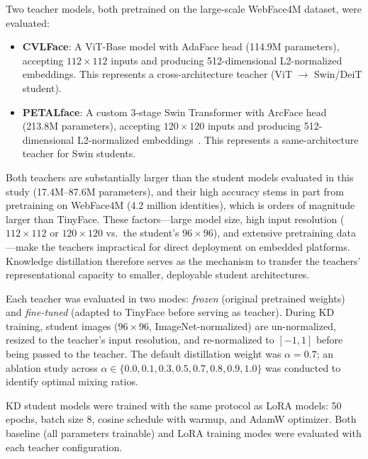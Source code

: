 \documentclass[runningheads,a4paper]{llncs}
\begin{document}
Two teacher models, both pretrained on the large-scale WebFace4M dataset, were evaluated:
\begin{itemize}
    \item \textbf{CVLFace}: A ViT-Base model with AdaFace head (114.9M parameters), accepting $112\times112$ inputs and producing 512-dimensional L2-normalized embeddings. This represents a cross-architecture teacher (ViT $\rightarrow$ Swin/DeiT student).
    \item \textbf{PETALface}: A custom 3-stage Swin Transformer with ArcFace head (213.8M parameters), accepting $120\times120$ inputs and producing 512-dimensional L2-normalized embeddings~\cite{narayan2025petalface}. This represents a same-architecture teacher for Swin students.
\end{itemize}
Both teachers are substantially larger than the student models evaluated in this study (17.4M--87.6M parameters), and their high accuracy stems in part from pretraining on WebFace4M (4.2 million identities), which is orders of magnitude larger than TinyFace. These factors---large model size, high input resolution ($112\times112$ or $120\times120$ vs.\ the student's $96\times96$), and extensive pretraining data---make the teachers impractical for direct deployment on embedded platforms. Knowledge distillation therefore serves as the mechanism to transfer the teachers' representational capacity to smaller, deployable student architectures.

Each teacher was evaluated in two modes: \emph{frozen} (original pretrained weights) and \emph{fine-tuned} (adapted to TinyFace before serving as teacher). During KD training, student images ($96\times96$, ImageNet-normalized) are un-normalized, resized to the teacher's input resolution, and re-normalized to $[-1, 1]$ before being passed to the teacher. The default distillation weight was $\alpha = 0.7$; an ablation study across $\alpha \in \{0.0, 0.1, 0.3, 0.5, 0.7, 0.8, 0.9, 1.0\}$ was conducted to identify optimal mixing ratios.

KD student models were trained with the same protocol as LoRA models: 50 epochs, batch size 8, cosine schedule with warmup, and AdamW optimizer. Both baseline (all parameters trainable) and LoRA training modes were evaluated with each teacher configuration.
\end{document}
